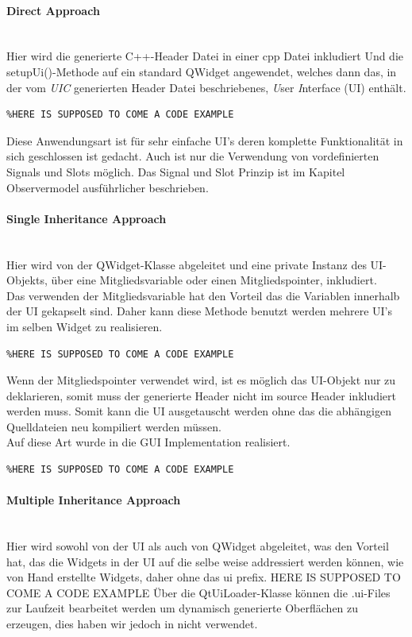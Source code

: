 \paragraph{Direct Approach}\\
Hier wird die generierte C++-Header Datei in einer cpp Datei inkludiert
Und die setupUi()-Methode auf ein standard QWidget angewendet, welches dann das, in der vom \textit{UIC} generierten Header Datei beschriebenes, \textit{U}ser \textit{I}nterface (UI) enthält.
\begin{lstlisting}
%HERE IS SUPPOSED TO COME A CODE EXAMPLE
\end{lstlisting}
Diese Anwendungsart ist für sehr einfache UI’s deren komplette Funktionalität in sich geschlossen ist gedacht. Auch ist nur die Verwendung von vordefinierten Signals und Slots möglich. Das Signal und Slot Prinzip ist im Kapitel Observermodel ausführlicher beschrieben.
\paragraph{Single Inheritance Approach}\\
Hier wird von der QWidget-Klasse abgeleitet und eine private Instanz des UI-Objekts, über eine Mitgliedsvariable oder einen Mitgliedspointer, inkludiert.\\
Das verwenden der Mitgliedsvariable hat den Vorteil das die Variablen innerhalb der UI gekapselt sind. Daher kann diese Methode benutzt werden mehrere UI’s im selben Widget zu realisieren.
\begin{lstlisting}
%HERE IS SUPPOSED TO COME A CODE EXAMPLE
\end{lstlisting}
Wenn der Mitgliedspointer verwendet wird, ist es möglich das UI-Objekt nur zu deklarieren, somit muss der generierte Header nicht im source Header inkludiert werden muss. Somit kann die UI ausgetauscht werden ohne das die abhängigen Quelldateien neu kompiliert werden müssen.\\ Auf diese Art wurde in \EBP die GUI Implementation realisiert. 
\begin{lstlisting}
%HERE IS SUPPOSED TO COME A CODE EXAMPLE
\end{lstlisting}
\paragraph{Multiple Inheritance Approach}\\
Hier wird sowohl von der UI als auch von QWidget abgeleitet, was den Vorteil hat, das die Widgets in der UI auf die selbe weise addressiert werden können, wie von Hand erstellte Widgets, daher ohne das ui prefix.
HERE IS SUPPOSED TO COME A CODE EXAMPLE
Über die QtUiLoader-Klasse können die .ui-Files zur Laufzeit bearbeitet werden um dynamisch generierte Oberflächen zu erzeugen, dies haben wir jedoch in \EBP nicht verwendet. 
\newpage
